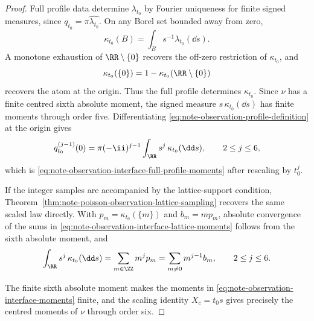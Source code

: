 \begin{proof}
Full profile data determine \(\lambda_{t_0}\) by Fourier uniqueness for
finite signed measures, since \(q_{t_0}=\pi\widehat{\lambda_{t_0}}\).  On any
Borel set bounded away from zero,
\[
\kappa_{t_0}(B)=\int_B s^{-1}\lambda_{t_0}(\dd s).
\]
A monotone exhaustion of \(\RR\setminus\{0\}\) recovers the off-zero
restriction of \(\kappa_{t_0}\), and
\[
\kappa_{t_0}(\{0\})=1-\kappa_{t_0}(\RR\setminus\{0\})
\]
recovers the atom at the origin.  Thus the full profile determines
\(\kappa_{t_0}\).  Since \(\nu\) has a finite centred sixth absolute moment,
the signed measure \(s\,\kappa_{t_0}(\dd s)\) has finite moments through order
five.  Differentiating \eqref{eq:note-observation-profile-definition} at the
origin gives
\[
q_{t_0}^{(j-1)}(0)
=\pi(-\ii)^{j-1}\int_{\RR}s^j\,\kappa_{t_0}(\dd s),
\qquad 2\le j\le6,
\]
which is \eqref{eq:note-observation-interface-full-profile-moments} after
rescaling by \(t_0^j\).

If the integer samples are accompanied by the lattice-support condition,
Theorem~\ref{thm:note-poisson-observation-lattice-sampling} recovers the same
scaled law directly.  With \(p_m=\kappa_{t_0}(\{m\})\) and \(b_m=mp_m\),
absolute convergence of the sums in
\eqref{eq:note-observation-interface-lattice-moments} follows from the sixth
absolute moment, and
\[
\int_{\RR}s^j\,\kappa_{t_0}(\dd s)
=\sum_{m\in\ZZ}m^j p_m
=\sum_{m\ne0}m^{j-1}b_m,
\qquad 2\le j\le6 .
\]

The finite sixth absolute moment makes the moments in
\eqref{eq:note-observation-interface-moments} finite, and the scaling identity
\(X_c=t_0s\) gives precisely the centred moments of \(\nu\) through order
six.
\end{proof}
